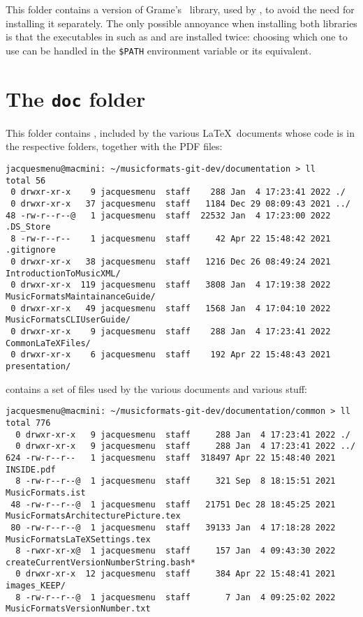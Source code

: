 This folder contains a version of Grame's \libmusicxml\ library, used by \mf, to avoid the need for installing it separately. The only possible annoyance when installing both libraries is that the executables in  such as  and  are installed twice: choosing which one to use can be handled in the {\tt \$\textbraceleft PATH\textbraceright} environment variable or its equivalent.


\section{The {\tt doc} folder}

This folder contains , included by the various \LaTeX\ documents whose code is in the respective folders, together with the PDF files:
\begin{lstlisting}[language=Terminal]
jacquesmenu@macmini: ~/musicformats-git-dev/documentation > ll
total 56
 0 drwxr-xr-x    9 jacquesmenu  staff    288 Jan  4 17:23:41 2022 ./
 0 drwxr-xr-x   37 jacquesmenu  staff   1184 Dec 29 08:09:43 2021 ../
48 -rw-r--r--@   1 jacquesmenu  staff  22532 Jan  4 17:23:00 2022 .DS_Store
 8 -rw-r--r--    1 jacquesmenu  staff     42 Apr 22 15:48:42 2021 .gitignore
 0 drwxr-xr-x   38 jacquesmenu  staff   1216 Dec 26 08:49:24 2021 IntroductionToMusicXML/
 0 drwxr-xr-x  119 jacquesmenu  staff   3808 Jan  4 17:19:38 2022 MusicFormatsMaintainanceGuide/
 0 drwxr-xr-x   49 jacquesmenu  staff   1568 Jan  4 17:04:10 2022 MusicFormatsCLIUserGuide/
 0 drwxr-xr-x    9 jacquesmenu  staff    288 Jan  4 17:23:41 2022 CommonLaTeXFiles/
 0 drwxr-xr-x    6 jacquesmenu  staff    192 Apr 22 15:48:43 2021 presentation/
\end{lstlisting}

 contains a set of files used by the various documents and various stuff:
\begin{lstlisting}[language=Terminal]
jacquesmenu@macmini: ~/musicformats-git-dev/documentation/common > ll
total 776
  0 drwxr-xr-x   9 jacquesmenu  staff     288 Jan  4 17:23:41 2022 ./
  0 drwxr-xr-x   9 jacquesmenu  staff     288 Jan  4 17:23:41 2022 ../
624 -rw-r--r--   1 jacquesmenu  staff  318497 Apr 22 15:48:40 2021 INSIDE.pdf
  8 -rw-r--r--@  1 jacquesmenu  staff     321 Sep  8 18:15:51 2021 MusicFormats.ist
 48 -rw-r--r--@  1 jacquesmenu  staff   21751 Dec 28 18:45:25 2021 MusicFormatsArchitecturePicture.tex
 80 -rw-r--r--@  1 jacquesmenu  staff   39133 Jan  4 17:18:28 2022 MusicFormatsLaTeXSettings.tex
  8 -rwxr-xr-x@  1 jacquesmenu  staff     157 Jan  4 09:43:30 2022 createCurrentVersionNumberString.bash*
  0 drwxr-xr-x  12 jacquesmenu  staff     384 Apr 22 15:48:41 2021 images_KEEP/
  8 -rw-r--r--@  1 jacquesmenu  staff       7 Jan  4 09:25:02 2022  MusicFormatsVersionNumber.txt
\end{lstlisting}


